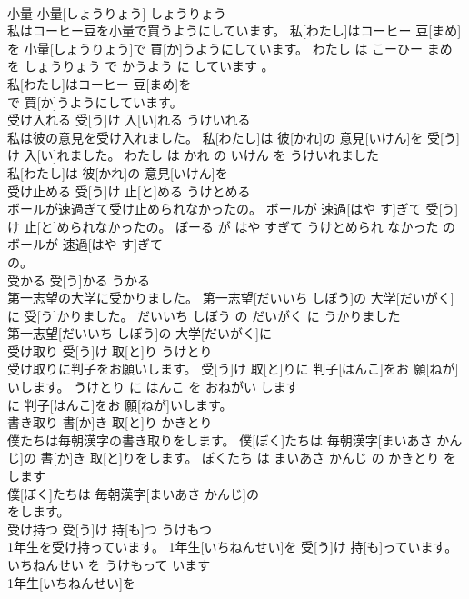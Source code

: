 \documentclass[8pt]{extreport}
\begin{document}
\begin{CJK}{UTF8}{min}
\\	小量	小量[しょうりょう]	しょうりょう	
\\	私はコーヒー豆を小量で買うようにしています。	私[わたし]はコーヒー 豆[まめ]を 小量[しょうりょう]で 買[か]うようにしています。	わたし は こーひー まめ を しょうりょう で かうよう に しています 。	
\\	私[わたし]はコーヒー 豆[まめ]を
\\	で 買[か]うようにしています。			
\\	受け入れる	受[う]け 入[い]れる	うけいれる	
\\	私は彼の意見を受け入れました。	私[わたし]は 彼[かれ]の 意見[いけん]を 受[う]け 入[い]れました。	わたし は かれ の いけん を うけいれました	
\\	私[わたし]は 彼[かれ]の 意見[いけん]を
\\	受け止める	受[う]け 止[と]める	うけとめる	
\\	ボールが速過ぎて受け止められなかったの。	ボールが 速過[はや す]ぎて 受[う]け 止[と]められなかったの。	ぼーる が はや すぎて うけとめられ なかった の	
\\	ボールが 速過[はや す]ぎて
\\	の。			
\\	受かる	受[う]かる	うかる	
\\	第一志望の大学に受かりました。	第一志望[だいいち しぼう]の 大学[だいがく]に 受[う]かりました。	だいいち しぼう の だいがく に うかりました	
\\	第一志望[だいいち しぼう]の 大学[だいがく]に
\\	受け取り	受[う]け 取[と]り	うけとり	
\\	受け取りに判子をお願いします。	受[う]け 取[と]りに 判子[はんこ]をお 願[ねが]いします。	うけとり に はんこ を おねがい します	
\\	に 判子[はんこ]をお 願[ねが]いします。			
\\	書き取り	書[か]き 取[と]り	かきとり	
\\	僕たちは毎朝漢字の書き取りをします。	僕[ぼく]たちは 毎朝漢字[まいあさ かんじ]の 書[か]き 取[と]りをします。	ぼくたち は まいあさ かんじ の かきとり を します	
\\	僕[ぼく]たちは 毎朝漢字[まいあさ かんじ]の
\\	をします。			
\\	受け持つ	受[う]け 持[も]つ	うけもつ	
\\	1年生を受け持っています。	1年生[いちねんせい]を 受[う]け 持[も]っています。	いちねんせい を うけもって います	
\\	1年生[いちねんせい]を

\end{CJK}
\end{document}

